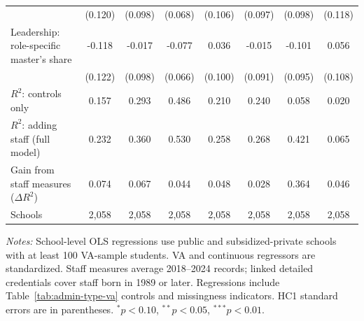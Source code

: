 \begin{table}[!htbp]
{\begin{tabular}{lccccccc}
 & (0.120) & (0.098) & (0.068) & (0.106) & (0.097) & (0.098) & (0.118) \\
\quad Leadership: role-specific master's share & -0.118 & -0.017 & -0.077 & 0.036 & -0.015 & -0.101 & 0.056 \\
 & (0.122) & (0.098) & (0.066) & (0.100) & (0.091) & (0.095) & (0.108) \\
\midrule
$R^2$: controls only & 0.157 & 0.293 & 0.486 & 0.210 & 0.240 & 0.058 & 0.020 \\
$R^2$: adding staff (full model) & 0.232 & 0.360 & 0.530 & 0.258 & 0.268 & 0.421 & 0.065 \\
Gain from staff measures ($\Delta R^2$) & 0.074 & 0.067 & 0.044 & 0.048 & 0.028 & 0.364 & 0.046 \\
Schools & 2,058 & 2,058 & 2,058 & 2,058 & 2,058 & 2,058 & 2,058 \\
\bottomrule
\end{tabular}}
\par\medskip
\footnotesize
\begin{minipage}{\textwidth}
\textit{Notes:} School-level OLS regressions use public and subsidized-private schools with at least 100 VA-sample students. VA and continuous regressors are standardized. Staff measures average 2018--2024 records; linked detailed credentials cover staff born in 1989 or later. Regressions include Table~\ref{tab:admin-type-va} controls and missingness indicators. HC1 standard errors are in parentheses. $^{*}p<0.10$, $^{**}p<0.05$, $^{***}p<0.01$.
\end{minipage}
\end{table}
